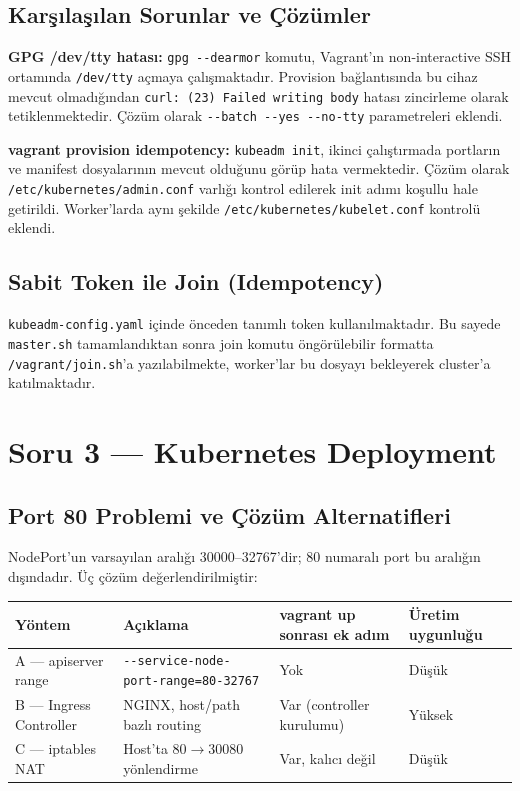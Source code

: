 \documentclass[12pt,a4paper]{article}
\begin{document}
\subsection{Karşılaşılan Sorunlar ve Çözümler}

\textbf{GPG /dev/tty hatası:}
\texttt{gpg -{}-dearmor} komutu, Vagrant'ın non-interactive SSH
ortamında \texttt{/dev/tty} açmaya çalışmaktadır. Provision
bağlantısında bu cihaz mevcut olmadığından \texttt{curl: (23) Failed
writing body} hatası zincirleme olarak tetiklenmektedir. Çözüm olarak
\texttt{-{}-batch -{}-yes -{}-no-tty} parametreleri eklendi.

\textbf{vagrant provision idempotency:}
\texttt{kubeadm init}, ikinci çalıştırmada portların ve manifest
dosyalarının mevcut olduğunu görüp hata vermektedir. Çözüm olarak
\texttt{/etc/kubernetes/admin.conf} varlığı kontrol edilerek init adımı
koşullu hale getirildi. Worker'larda aynı şekilde
\texttt{/etc/kubernetes/kubelet.conf} kontrolü eklendi.

\subsection{Sabit Token ile Join (Idempotency)}

\texttt{kubeadm-config.yaml} içinde önceden tanımlı token kullanılmaktadır.
Bu sayede \texttt{master.sh} tamamlandıktan sonra join komutu öngörülebilir
formatta \texttt{/vagrant/join.sh}'a yazılabilmekte, worker'lar bu
dosyayı bekleyerek cluster'a katılmaktadır.

\section{Soru 3 — Kubernetes Deployment}

\subsection{Port 80 Problemi ve Çözüm Alternatifleri}

NodePort'un varsayılan aralığı 30000--32767'dir; 80 numaralı port bu
aralığın dışındadır. Üç çözüm değerlendirilmiştir:

\begin{center}
\begin{tabularx}{\textwidth}{lXll}
\toprule
\textbf{Yöntem} & \textbf{Açıklama} & \textbf{vagrant up sonrası ek adım} & \textbf{Üretim uygunluğu} \\
\midrule
A — apiserver range & \texttt{-{}-service-node-port-range=80-32767} & Yok & Düşük \\
B — Ingress Controller & NGINX, host/path bazlı routing & Var (controller kurulumu) & Yüksek \\
C — iptables NAT & Host'ta 80$\to$30080 yönlendirme & Var, kalıcı değil & Düşük \\
\bottomrule
\end{tabularx}
\end{center}
\end{document}
